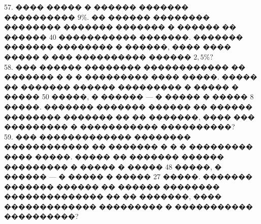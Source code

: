 \documentclass[12pt]{article}
\begin{document}
57. ���� ����� � ������ ������� ���������� $9\%.$ �� ������ �������� �������� ������� ������� � ������ �� ������ 40 ����������� �������. ������� ������� �������� � ������, ���� ���� ����� � ��� ���������� ������ $2,5\%?$\\
58. ��� ������ �������� ������������ �� ������� � � � ��������� ���� �����. ����� �� ������� ������ ��������� � ����� � ����� 50 �����, � ������ --- � ����� � ����� 8 �����. ������� ������� ������ �� ������ �������� ������� �� �� �������, ���� ��� ��������� � ����������� ����������?\\
59. ��� ������������� �������� ������������ �� ������� � � � ��������� ���� �����. ����� �� ������� ������ ��������� � ����� � ����� 48 �����, � ������ --- � ����� � ����� 27 �����. ������� ������� ������ �� ������ �������� �������������� �� �� �������, ���� ������������� ��������� � ����������� ����������?
\newpage
\end{document}
